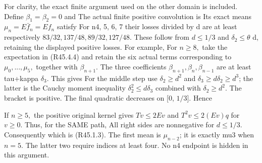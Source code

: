 For clarity, the exact finite argument used on the other domain
is included. Define \(\beta_1=\beta_2=0\) and
The actual finite positive convolution is
Its exact means \(\mu_n=E\bar f_n=Ef_n\) satisfy
For n4, 5, 6, 7 their losses divided by d are at least respectively
\(83/32,\allowbreak  137/48,\allowbreak  89/32,\allowbreak  127/48.\) These follow from \(d\le 1/3\) and
\(\delta_2\le \theta\) d, retaining the displayed positive losses. For example,
For \(n\ge 8,\allowbreak \) take the expectation in (R45.4.4) and retain the six actual
terms corresponding to \(\mu_0,\allowbreak ...,\allowbreak  \mu_5,\allowbreak \) together with \(\beta_{n+1}.\)
The three coefficients \(\beta_{n+1},\allowbreak  \beta_n,\allowbreak  \beta_{n-1}\) are at least
tau+kappa \(\delta_3.\) This gives
For the middle step use \(\delta_2\ge d^2\) and \(\delta_3\ge d \delta_2\ge d^3\); the latter
is the Cauchy moment inequality \(\delta_2^2\le d \delta_3\) combined with \(\delta_2\ge d^2.\)
The bracket is positive. The final quadratic decreases on [0, \(1/3\)].
Hence


If \(n\ge 5,\allowbreak \) the positive original kernel gives \(Tv\le 2Ev\) and
\(T^2v\le 2(Ev)q\) for \(v\ge 0.\) Thus, for the SAME path,
All right sides are nonnegative for \(d\le 1/3.\) Consequently
which is (R45.1.3). The first mean is \(\mu_{n-2}\); it is exactly mu3 when
\(n=5.\) The latter two require indices at least four. No n4 endpoint is
hidden in this argument.


